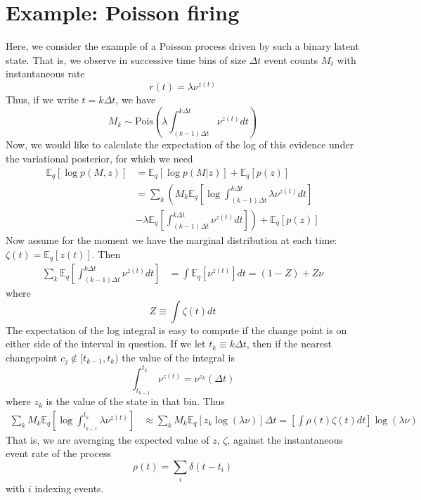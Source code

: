 \documentclass[11pt]{article}
\begin{document}
\section{Example: Poisson firing}
Here, we consider the example of a Poisson process driven by such a binary latent state. That is, we observe in successive time bins of size $\Delta t$ event counts $M_t$ with instantaneous rate
\begin{equation}
    r(t) = \lambda \nu^{z(t)}
\end{equation}
Thus, if we write $t = k\Delta t$, we have
\begin{equation}
    M_k \sim \text{Pois}\left(\lambda \int_{(k - 1)\Delta t}^{k\Delta t} \nu^{z(t)} dt\right)
\end{equation}
Now, we would like to calculate the expectation of the log of this evidence under the variational posterior, for which we need
\begin{align}
    \mathbb{E}_q[\log p(M, z)] &= \mathbb{E}_q[\log p(M|z)] + \mathbb{E}_q[p(z)] \\
    &= \sum_k \left(M_k \mathbb{E}_q \left[ \log \int_{(k - 1)\Delta t}^{k\Delta t} \lambda \nu^{z(t)} dt \right] \right. \\
    &- \left.\lambda \mathbb{E}_q\left[ \int_{(k - 1)\Delta t}^{k\Delta t} \nu^{z(t)} dt\right]\right)
    + \mathbb{E}_q[p(z)]
\end{align}
Now assume for the moment we have the marginal distribution at each time: $\zeta(t) = \mathbb{E}_q[z(t)]$. Then
\begin{align}
    \sum_k \mathbb{E}_q\left[ \int_{(k - 1)\Delta t}^{k\Delta t} \nu^{z(t)} dt\right] &= \int \mathbb{E}_q \left[\nu^{z(t)}\right] dt = (1 - Z) + Z\nu
\end{align}
where
\begin{equation}
    Z \equiv \int \zeta(t) dt
\end{equation}
The expectation of the log integral is easy to compute if the change point is on either side of the interval in question. If we let $t_k \equiv k \Delta t$, then if the nearest changepoint $c_j \notin [t_{k -1}, t_k)$ the value of the integral is 
\begin{equation}
    \int_{t_{k - 1}}^{t_k} \nu^{z(t)} = \nu^{z_k}(\Delta t) 
\end{equation}
where $z_k$ is the value of the state in that bin. Thus
\begin{align}
    \sum_k M_k \mathbb{E}_q \left[
    \log \int_{t_{k - 1}}^{t_k} \lambda \nu^{z(t)}
    \right] 
    &\approx \sum_k M_k \mathbb{E}_q \left[z_k \log (\lambda\nu) \right] \Delta t = \left[\int \rho(t) \zeta(t) dt \right] \log (\lambda \nu)
\end{align}
That is, we are averaging the expected value of $z$, $\zeta$, against the instantaneous event rate of the process
\begin{equation}
    \rho(t) = \sum_i \delta(t - t_i)
\end{equation}
with $i$ indexing events.
\end{document}

